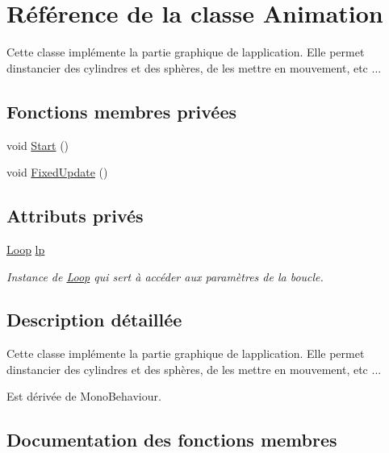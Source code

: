 \hypertarget{class_animation}{}\section{Référence de la classe Animation}
\label{class_animation}


Cette classe implémente la partie graphique de l\textquotesingle{}application. Elle permet d\textquotesingle{}instancier des cylindres et des sphères, de les mettre en mouvement, etc ...  


\subsection*{Fonctions membres privées}
\begin{DoxyCompactItemize}
\item 
void \hyperlink{class_animation_a0038ffad19fbd62bd1c86afc6dc8d34f}{Start} ()
\item 
void \hyperlink{class_animation_a8d468e34c3e634095e37d3b0699f1fe3}{Fixed\+Update} ()
\end{DoxyCompactItemize}
\subsection*{Attributs privés}
\begin{DoxyCompactItemize}
\item 
\hyperlink{class_loop}{Loop} \hyperlink{class_animation_a253570e7f5a2ddd01090a69278162333}{lp}
\begin{DoxyCompactList}\small\item\em Instance de \hyperlink{class_loop}{Loop} qui sert à accéder aux paramètres de la boucle. \end{DoxyCompactList}\end{DoxyCompactItemize}


\subsection{Description détaillée}
Cette classe implémente la partie graphique de l\textquotesingle{}application. Elle permet d\textquotesingle{}instancier des cylindres et des sphères, de les mettre en mouvement, etc ... 



Est dérivée de Mono\+Behaviour.



\subsection{Documentation des fonctions membres}
\hypertarget{class_animation_a8d468e34c3e634095e37d3b0699f1fe3}{}
